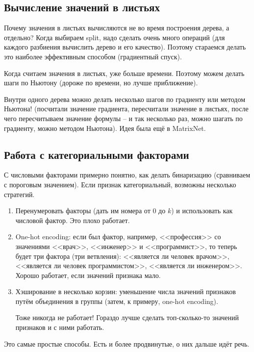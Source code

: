 \documentclass[a4paper,12pt]{article}
\begin{document}
\subsection{Вычисление значений в листьях}

Почему значения в листьях вычисляются не во время построения дерева, а отдельно?
Когда выбираем split, надо сделать очень много операций (для каждого разбиения вычислить дерево и его качество).
Поэтому стараемся делать это наиболее эффективным способом (градиентный спуск).

Когда считаем значения в листьях, уже больше времени.
Поэтому можем делать шаги по Ньютону (дороже по времени, но лучше приближение).

Внутри одного дерева можно делать несколько шагов по градиенту или методом Ньютона! (посчитали значение градиента, пересчитали значение в листьях, после чего пересчитываем значение формулы -- и так несколько раз, можно шагать по градиенту, можно методом Ньютона). Идея была ещё в MatrixNet.

\subsection{Работа с категориальными факторами}

С числовыми факторами примерно понятно, как делать бинаризацию (сравниваем с пороговым значением).
Если признак категориальный, возможны несколько стратегий.
\begin{enumerate}[noitemsep]
    \item Перенумеровать факторы (дать им номера от $0$ до $k$) и использовать как числовой фактор.
    Это плохо работает.
    \item One-hot encoding: если был фактор, например, <<профессия>> со значениями <<врач>>, <<инженер>> и <<программист>>, то теперь будет три фактора (три ветвления): <<является ли человек врачом>>, <<является ли человек программистом>>, <<является ли инженером>>.
    Хорошо работает, если значений признака мало.
    \item Хэширование в несколько корзин: уменьшение числа значений признаков путём объединения в группы (затем, к примеру, one-hot encoding).

    Тоже никогда не работает!
    Гораздо лучше сделать топ-сколько-то значений признаков и с ними работать.
\end{enumerate}

Это самые простые способы. Есть и более продвинутые, о них дальше идёт речь.
\end{document}
